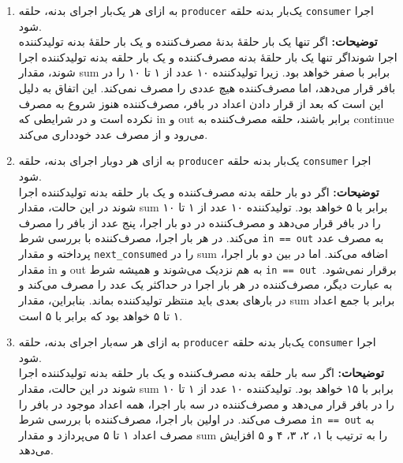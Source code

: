 \begin{qsolve}
	\begin{enumerate}
		\item به ازای هر یک‌بار اجرای بدنه، حلقه \texttt{producer} یک‌بار بدنه حلقه \texttt{consumer} اجرا شود.\\ \textbf{توضیحات: }
اگر تنها یک بار حلقهٔ بدنهٔ مصرف‌کننده و یک بار حلقهٔ بدنه تولیدکننده اجرا شونداگر تنها یک بار حلقهٔ بدنه مصرف‌کننده و یک بار حلقه بدنه تولیدکننده اجرا شوند، مقدار sum برابر با صفر خواهد بود. زیرا تولیدکننده ۱۰ عدد از ۱ تا ۱۰ را در بافر قرار می‌دهد، اما مصرف‌کننده هیچ عددی را مصرف نمی‌کند. این اتفاق به دلیل این است که بعد از قرار دادن اعداد در بافر، مصرف‌کننده هنوز شروع به مصرف نکرده است و در شرایطی که in و out برابر باشند، حلقه مصرف‌کننده به continue می‌رود و از مصرف عدد خودداری می‌کند.

	\item به ازای هر دو‌بار اجرای بدنه، حلقه \texttt{producer} یک‌بار بدنه حلقه \texttt{consumer} اجرا شود.\\ \textbf{توضیحات: }
اگر دو بار حلقه بدنه مصرف‌کننده و یک بار حلقه بدنه تولیدکننده اجرا شوند
در این حالت، مقدار sum برابر با ۵ خواهد بود. تولیدکننده ۱۰ عدد از ۱ تا ۱۰ را در بافر قرار می‌دهد و مصرف‌کننده در دو بار اجرا، پنج عدد از بافر را مصرف می‌کند. در هر بار اجرا، مصرف‌کننده با بررسی شرط \texttt{in == out} به مصرف عدد پرداخته و مقدار \texttt{next\_consumed} را در sum اضافه می‌کند. اما در بین دو بار اجرا، مقدار in و out به هم نزدیک می‌شوند و همیشه شرط \texttt{in == out }برقرار نمی‌شود. به عبارت دیگر، مصرف‌کننده در هر بار اجرا در حداکثر یک عدد را مصرف می‌کند و در بارهای بعدی باید منتظر تولیدکننده بماند. بنابراین، مقدار sum برابر با جمع اعداد ۱ تا ۵ خواهد بود که برابر با ۵ است.
	
	
	\item به ازای هر سه‌بار اجرای بدنه، حلقه \texttt{producer} یک‌بار بدنه حلقه \texttt{consumer} اجرا شود.\\ \textbf{توضیحات: }
اگر سه بار حلقه بدنه مصرف‌کننده و یک بار حلقه بدنه تولیدکننده اجرا شوند
در این حالت، مقدار sum برابر با ۱۵ خواهد بود. تولیدکننده ۱۰ عدد از ۱ تا ۱۰ را در بافر قرار می‌دهد و مصرف‌کننده در سه بار اجرا، همه اعداد موجود در بافر را مصرف می‌کند. در اولین بار اجرا، مصرف‌کننده با بررسی شرط \texttt{in == out} به مصرف اعداد ۱ تا ۵ می‌پردازد و مقدار sum را به ترتیب با ۱، ۲، ۳، ۴ و ۵ افزایش می‌دهد.
	
	\end{enumerate}
\end{qsolve}